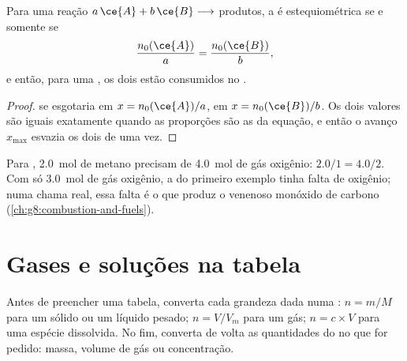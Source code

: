 \begin{proposition}\label{prop:g10:reaction-progress-table:together}
Para uma reação $a\,\ce{A} + b\,\ce{B} \longrightarrow$ produtos, a  é estequiométrica se
e somente se
\[
  \frac{n_0(\ce{A})}{a} = \frac{n_0(\ce{B})}{b},
\]
e então, para uma , os dois  estão consumidos no
.
\end{proposition}

\begin{proof}
 se esgotaria em $x = n_0(\ce{A})/a$,  em $x = n_0(\ce{B})/b$.
Os dois valores são iguais exatamente quando as proporções são as da
equação, e então o avanço $x_{\max}$ esvazia os dois de uma vez.
\end{proof}

\begin{example}\label{ex:g10:reaction-progress-table:stoich}
Para , \qty{2.0}{mol} de metano precisam de
\qty{4.0}{mol} de gás oxigênio: $2.0/1 = 4.0/2$. Com só \qty{3.0}{mol}
de gás oxigênio, a  do primeiro exemplo tinha falta de oxigênio;
numa chama real, essa falta é o que produz o venenoso monóxido de
carbono (\cref{ch:g8:combustion-and-fuels}).
\end{example}

\section{Gases e soluções na tabela}


\begin{method}\label{met:g10:reaction-progress-table:amounts}
Antes de preencher uma tabela, converta cada grandeza dada numa
: $n = m/M$ para um sólido ou um líquido pesado;
$n = V/V_m$ para um gás; $n = c \times V$ para uma espécie dissolvida.
No fim, converta de volta as quantidades do  no que for
pedido: massa, volume de gás ou concentração.
\end{method}

